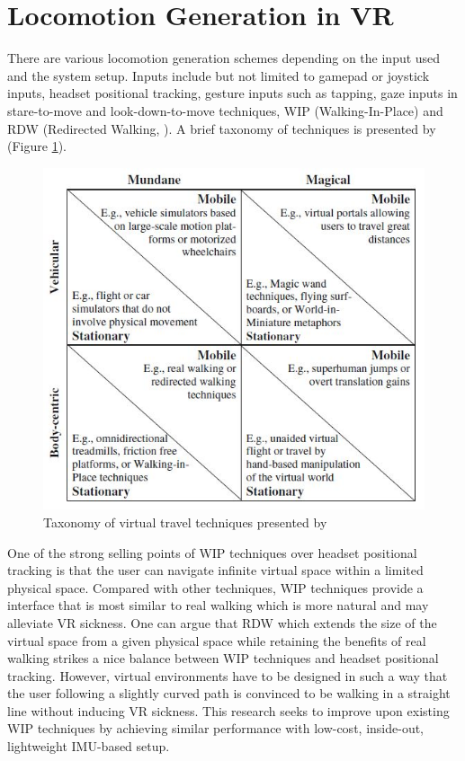 \newpage

\section{Locomotion Generation in VR}

There are various locomotion generation schemes depending on the input used and the system setup. Inputs include but not limited to gamepad or joystick inputs, headset positional tracking, gesture inputs such as tapping, gaze inputs in stare-to-move and look-down-to-move techniques, WIP (Walking-In-Place) and RDW (Redirected Walking, \cite{Raz01}). A brief taxonomy of techniques is presented by \cite{Nil16} (Figure \ref{fig:taxonomy}).

\begin{figure}[th]
\captionsetup{justification=raggedright,singlelinecheck=false}
\centering
\includegraphics{Figures/taxonomy.jpg}
\decoRule
\caption[Taxonomy of virtual travel techniques]{Taxonomy of virtual travel techniques presented by \cite{Nil16}}
\label{fig:taxonomy}
\end{figure}
\noindent
One of the strong selling points of WIP techniques over headset positional tracking is that the user can navigate infinite virtual space within a limited physical space. Compared with other techniques, WIP techniques provide a interface that is most similar to real walking which is more natural and may alleviate VR sickness. One can argue that RDW which extends the size of the virtual space from a given physical space while retaining the benefits of real walking strikes a nice balance between WIP techniques and headset positional tracking. However, virtual environments have to be designed in such a way that the user following a slightly curved path is convinced to be walking in a straight line without inducing VR sickness. This research seeks to improve upon existing WIP techniques by achieving similar performance with low-cost, inside-out, lightweight IMU-based setup.

